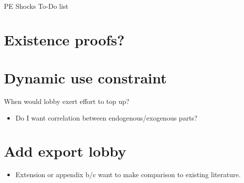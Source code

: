 \documentclass[12pt]{article}
\begin{document}
\begin{center}
PE Shocks To-Do list
\end{center}



\section{Existence proofs?}


\section{Dynamic use constraint}
When would lobby exert effort to top up?
\begin{itemize}
	\item Do I want correlation between endogenous/exogenous parts? 
\end{itemize}


\section{Add export lobby}
		\begin{itemize}
			\item Extension or appendix b/c want to make comparison to existing literature.
		\end{itemize}
\end{document}
